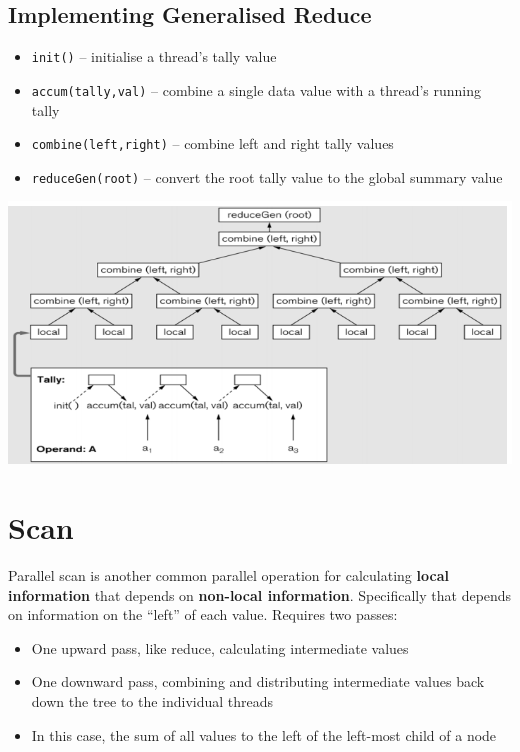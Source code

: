 \documentclass{article}
\begin{document}
\subsection{Implementing	Generalised	Reduce}
\begin{itemize}
  \item \verb!init()! – initialise a thread’s tally value 
  \item \verb!accum(tally,val)! – combine a single data value with a thread’s running tally
  \item \verb!combine(left,right)! – combine left and right tally values 
  \item \verb!reduceGen(root)! – convert the root tally value to the global summary value
\end{itemize}

\begin{center}
  \includegraphics[scale=0.5]{reduce_combine.png}
\end{center}

\section{Scan}
\begin{flushleft}
Parallel scan is another common parallel operation for calculating \textbf{local information} that depends on \textbf{non-local information}. Specifically that depends on information on the “left” of each value. Requires two passes:
\begin{itemize}
  \item One upward pass, like reduce, calculating intermediate values 
  \item One downward pass, combining and distributing intermediate values back down the tree to the individual threads 
  \item In this case, the sum of all values to the left of the left-most child of a node
\end{itemize}
\end{flushleft}
\end{document}
